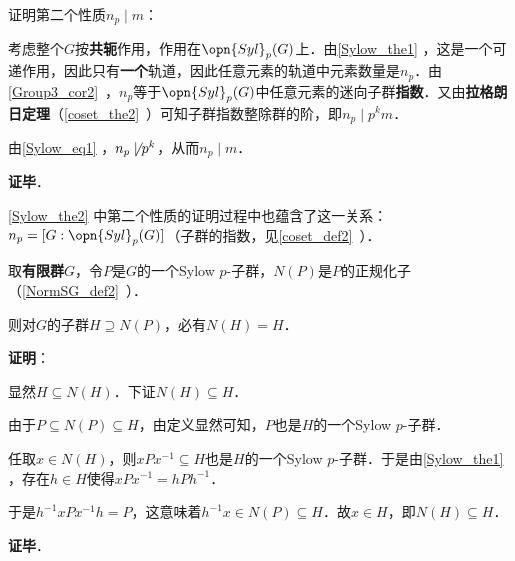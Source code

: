 证明第二个性质$n_p\mid m$：

考虑整个$G$按\textbf{共轭}作用，作用在$\opn{Syl}_p(G)$上．由\autoref{Sylow_the1} ，这是一个可递作用，因此只有\textbf{一个}轨道，因此任意元素的轨道中元素数量是$n_p$．由\autoref{Group3_cor2}~，$n_p$等于$\opn{Syl}_p(G)$中任意元素的迷向子群\textbf{指数}．又由\textbf{拉格朗日定理}（\autoref{coset_the2}~）可知子群指数整除群的阶，即$n_p\mid p^km$．

由\autoref{Sylow_eq1} ，$n_p\not \mid p^k$，从而$n_p\mid m$．


\textbf{证毕}．

\autoref{Sylow_the2} 中第二个性质的证明过程中也蕴含了这一关系：$n_p=[G:\opn{Syl}_p(G)]$（子群的指数，见\autoref{coset_def2}~）．


\begin{theorem}{}
取\textbf{有限群}$G$，令$P$是$G$的一个Sylow $p$-子群，$N(P)$是$P$的正规化子（\autoref{NormSG_def2}~）．

则对$G$的子群$H\supseteq N(P)$，必有$N(H)=H$．
\end{theorem}

\textbf{证明}：

显然$H\subseteq N(H)$．下证$N(H)\subseteq H$．

由于$P\subseteq N(P)\subseteq H$，由定义显然可知，$P$也是$H$的一个Sylow $p$-子群．

任取$x\in N(H)$，则$xPx^{-1}\subseteq H$也是$H$的一个Sylow $p$-子群．于是由\autoref{Sylow_the1} ，存在$h\in H$使得$xPx^{-1}=hPh^{-1}$．

于是$h^{-1}xPx^{-1}h=P$，这意味着$h^{-1}x\in N(P)\subseteq H$．故$x\in H$，即$N(H)\subseteq H$．

\textbf{证毕}．















